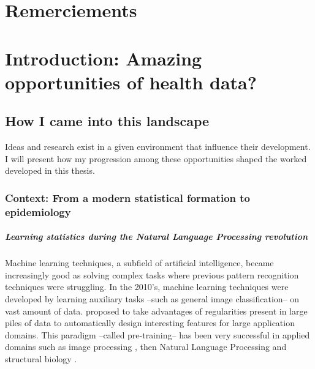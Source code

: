 \documentclass[french,12pt,twoside,a4paper]{book}
\begin{document}
\newpage
\chapter*{Remerciements}

\pagestyle{basic}%

\newpage
\tableofcontents

\mainmatter

\chapter{Introduction: Amazing opportunities of health data?}\label{chap:intro}
\section{How I came into this landscape}\label{sec:intro:landscape}

Ideas and research exist in a given environment that influence their development. I will
present how my progression among these opportunities shaped the worked developed
in this thesis.

\subsection{Context: From a modern statistical formation to epidemiology}\label{subsec:intro:context}

\paragraph{Learning statistics during the Natural Language Processing revolution}

Machine learning techniques, a subfield of artificial intelligence, became
increasingly good as solving complex tasks where previous pattern recognition
techniques were struggling. In the 2010's, machine learning techniques were
developed by learning auxiliary tasks --such as general image classification--
on vast amount of data. \cite{halevy2009unreasonable} proposed to take
advantages of regularities present in large piles of data to automatically
design interesting features for large application domains. This paradigm
--called pre-training-- has been very successful in applied domains such as
image processing \citep{krizhevsky2012imagenet}, then Natural Language
Processing \citep{devlin2018bert} and structural biology
\citep{jumper2021highly}.
\end{document}
